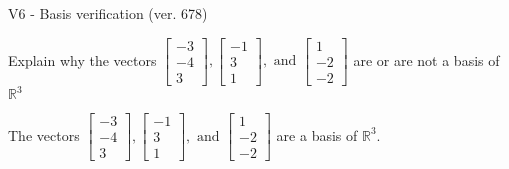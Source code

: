 \begin{exercise}
  \begin{exerciseTitle}V6 - Basis verification (ver. 678)\end{exerciseTitle}
  \begin{exerciseStatement}
    Explain why the vectors \(\left[\begin{array}{r}
-3 \\
-4 \\
3
\end{array}\right] , \left[\begin{array}{r}
-1 \\
3 \\
1
\end{array}\right] , \text{ and } \left[\begin{array}{r}
1 \\
-2 \\
-2
\end{array}\right]\) are or are not a basis of \(\mathbb{R}^3\)	


  \end{exerciseStatement}
  \begin{exerciseAnswer}
   The vectors \(\left[\begin{array}{r}
-3 \\
-4 \\
3
\end{array}\right] , \left[\begin{array}{r}
-1 \\
3 \\
1
\end{array}\right] , \text{ and } \left[\begin{array}{r}
1 \\
-2 \\
-2
\end{array}\right]\) 
  	 are  a basis of \(\mathbb{R}^3\).
  


  \end{exerciseAnswer}
\end{exercise}